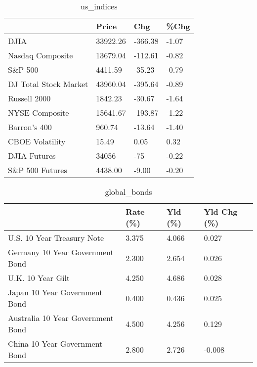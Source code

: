 \documentclass{article}%
\begin{document}
%


\begin{table}[htbp]%
\caption{us\_indices}%
\centering%
\begin{adjustbox}{width=1\textwidth}%
\begin{tabular}{llll}
\toprule
                      &    Price &     Chg &  \%Chg \\
\midrule
                 DJIA & 33922.26 & -366.38 & -1.07 \\
     Nasdaq Composite & 13679.04 & -112.61 & -0.82 \\
              S\&P 500 &  4411.59 &  -35.23 & -0.79 \\
DJ Total Stock Market & 43960.04 & -395.64 & -0.89 \\
         Russell 2000 &  1842.23 &  -30.67 & -1.64 \\
       NYSE Composite & 15641.67 & -193.87 & -1.22 \\
         Barron's 400 &   960.74 &  -13.64 & -1.40 \\
      CBOE Volatility &    15.49 &    0.05 &  0.32 \\
         DJIA Futures &    34056 &     -75 & -0.22 \\
      S\&P 500 Futures &  4438.00 &   -9.00 & -0.20 \\
\bottomrule
\end{tabular}
%
\end{adjustbox}%
\end{table}

%


\begin{table}[htbp]%
\caption{global\_bonds}%
\centering%
\begin{adjustbox}{width=1\textwidth}%
\begin{tabular}{llll}
\toprule
                                  & Rate (\%) & Yld (\%) & Yld Chg (\%) \\
\midrule
       U.S. 10 Year Treasury Note &    3.375 &   4.066 &       0.027 \\
  Germany 10 Year Government Bond &    2.300 &   2.654 &       0.026 \\
                U.K. 10 Year Gilt &    4.250 &   4.686 &       0.028 \\
    Japan 10 Year Government Bond &    0.400 &   0.436 &       0.025 \\
Australia 10 Year Government Bond &    4.500 &   4.256 &       0.129 \\
    China 10 Year Government Bond &    2.800 &   2.726 &      -0.008 \\
\bottomrule
\end{tabular}
%
\end{adjustbox}%
\end{table}
\end{document}
